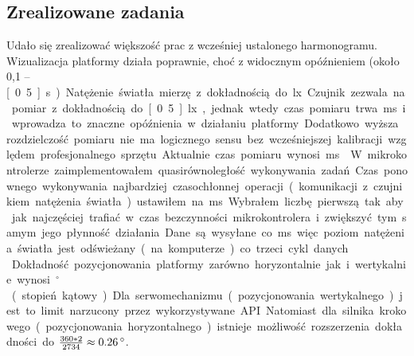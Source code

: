 \documentclass[10pt, a4paper]{article}
\begin{document}
	\subsection{Zrealizowane zadania}
	Udało się zrealizować większość prac z wcześniej ustalonego harmonogramu. Wizualizacja platformy działa poprawnie, choć z widocznym opóźnieniem (około 0,1 -- \unit[0.5]{s}). Natężenie światła mierzę z dokładnością do \unit[4]{lx}. Czujnik zezwala na pomiar z dokładnością do \unit[0.5]{lx}, jednak wtedy czas pomiaru trwa \unit[120]{ms} i wprowadza to znaczne opóźnienia w działaniu platformy. Dodatkowo wyższa rozdzielczość pomiaru nie ma logicznego sensu bez wcześniejszej kalibracji względem profesjonalnego sprzętu. Aktualnie czas pomiaru wynosi \unit[16]{ms}\label{16ms}. W mikrokontrolerze zaimplementowałem quasirównoległość wykonywania zadań. Czas ponownego wykonywania najbardziej czasochłonnej operacji (komunikacji z czujnikiem natężenia światła) ustawiłem na \unit[277]{ms}. Wybrałem liczbę pierwszą tak aby jak najczęściej trafiać w czas bezczynności mikrokontrolera i zwiększyć tym samym jego płynność działania. Dane są wysyłane co \unit[50]{ms} więc poziom natężenia światła jest odświeżany (na komputerze) co trzeci cykl danych. \\
	Dokładność pozycjonowania platformy zarówno horyzontalnie jak i wertykalnie wynosi \unit[1]{$^{\circ}$} (stopień kątowy). Dla serwomechanizmu (pozycjonowania wertykalnego) jest to limit narzucony przez wykorzystywane API. Natomiast dla silnika krokowego (pozycjonowania horyzontalnego) istnieje możliwość rozszerzenia dokładności do $\frac{360 * 2}{2734} \approx \unit[0.26]{^{\circ}}$.
\end{document}
